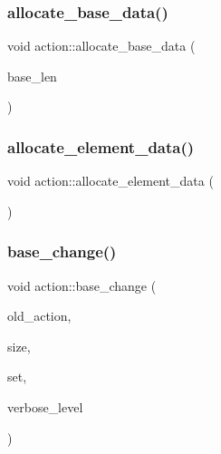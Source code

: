 \mbox{\label{classaction_a345fa8dfbb60c8a100ab4dd80a966b1b}} 
\subsubsection{\texorpdfstring{allocate\+\_\+base\+\_\+data()}{allocate\_base\_data()}}
{\footnotesize\ttfamily void action\+::allocate\+\_\+base\+\_\+data (\begin{DoxyParamCaption}\item[{\mbox{\hyperlink{galois_8h_a09fddde158a3a20bd2dcadb609de11dc}{I\+NT}}}]{base\+\_\+len }\end{DoxyParamCaption})}

\mbox{\label{classaction_adc5f98db8315bfd17fcd2fbb437d8f60}} 
\subsubsection{\texorpdfstring{allocate\+\_\+element\+\_\+data()}{allocate\_element\_data()}}
{\footnotesize\ttfamily void action\+::allocate\+\_\+element\+\_\+data (\begin{DoxyParamCaption}{ }\end{DoxyParamCaption})}

\mbox{\label{classaction_a1cab1a81da804692affaf9b7060c90f6}} 
\subsubsection{\texorpdfstring{base\+\_\+change()}{base\_change()}}
{\footnotesize\ttfamily void action\+::base\+\_\+change (\begin{DoxyParamCaption}\item[{\mbox{\hyperlink{classaction}{action}} $\ast$}]{old\+\_\+action,  }\item[{\mbox{\hyperlink{galois_8h_a09fddde158a3a20bd2dcadb609de11dc}{I\+NT}}}]{size,  }\item[{\mbox{\hyperlink{galois_8h_a09fddde158a3a20bd2dcadb609de11dc}{I\+NT}} $\ast$}]{set,  }\item[{\mbox{\hyperlink{galois_8h_a09fddde158a3a20bd2dcadb609de11dc}{I\+NT}}}]{verbose\+\_\+level }\end{DoxyParamCaption})}

